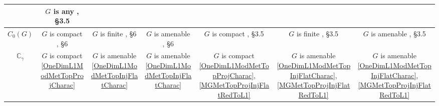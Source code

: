 \documentclass{article}
\theoremstyle{plain}
\theoremstyle{definition}
\begin{document}
\begin{fulltext}
\begin{table}[ht]
\begin{tiny}
\begin{tabular}{|c|c|c|c|c|c|c|}
{            } & 
            \shortstack{
                $G$ is any \\
				{\cite{RamsHomPropSemgroupAlg}, \S 3.5}
            } \\ 
        \hline
            $C_0(G)$ & 
            \shortstack{
                $G$ is compact \\
				{\cite{DalPolHomolPropGrAlg}, \S 6}
            } & 
            \shortstack{
                $G$ is finite \\
				{\cite{DalPolHomolPropGrAlg}, \S 6}
            } & 
            \shortstack{
                $G$ is amenable \\
				{\cite{DalPolHomolPropGrAlg}, \S 6}
            } & 
            \shortstack{
                $G$ is compact \\
				{\cite{RamsHomPropSemgroupAlg}, \S 3.5}
            } & 
            \shortstack{
                $G$ is finite \\
				{\cite{RamsHomPropSemgroupAlg}, \S 3.5}
            } & 
            \shortstack{
                $G$ is amenable \\
				{\cite{RamsHomPropSemgroupAlg}, \S 3.5}
            } \\ 
        \hline
            $\mathbb{C}_\gamma$ & 
            \shortstack{
                $G$ is compact \\ 
            {\ref{OneDimL1ModMetTopProjCharac}}
            } & 
            \shortstack{
                $G$ is amenable \\ 
            {\ref{OneDimL1ModMetTopInjFlatCharac}}
            } & 
            \shortstack{
                $G$ is amenable \\ 
            {\ref{OneDimL1ModMetTopInjFlatCharac}}
            } & 
            \shortstack{
                $G$ is compact \\ 
            {\ref{OneDimL1ModMetTopProjCharac}},
            {\ref{MGMetTopProjInjFlatRedToL1}}
            } & 
            \shortstack{
                $G$ is amenable \\ 
            {\ref{OneDimL1ModMetTopInjFlatCharac}},
            {\ref{MGMetTopProjInjFlatRedToL1}}
            } & 
            \shortstack{
                $G$ is amenable \\ 
            {\ref{OneDimL1ModMetTopInjFlatCharac}},
            {\ref{MGMetTopProjInjFlatRedToL1}}
            } \\                   
        \hline
        \end{tabular}
    \end{tiny}\label{HomolTrivModMetTh}
\end{table}


\end{fulltext}
\end{document}
